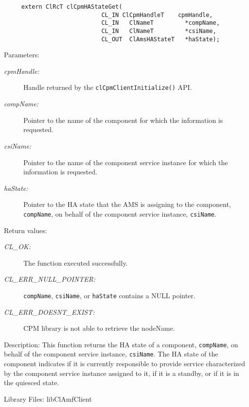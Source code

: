 {\begin{Desc}
\footnotesize\begin{verbatim}     extern ClRcT clCpmHAStateGet(
                  			CL_IN ClCpmHandleT    cpmHandle,
                  			CL_IN   ClNameT         *compName,
                  			CL_IN   ClNameT         *csiName,
                  			CL_OUT  ClAmsHAStateT   *haState);
\end{verbatim}
\normalsize
\end{Desc}
\begin{Desc}
\item[Parameters:]
\begin{description}
\item[{\em cpm\-Handle:}]Handle returned by the {\tt{cl\-Cpm\-Client\-Initialize()}} API. 
\item[{\em comp\-Name:}]Pointer to the name of the component for which the information is requested.
\item[{\em csi\-Name:}]Pointer to the name of the component service instance for which the information is requested.
\item[{\em ha\-State:}]Pointer to the HA state that the AMS is assigning to the component, {\tt{comp\-Name}}, on behalf of the component service instance,
{\tt{csi\-Name}}.
\end{description}
\end{Desc}
\begin{Desc}
\item[Return values:]
\begin{description}
\item[{\em CL\_\-OK:}]The function executed successfully. 
\item[{\em CL\_\-ERR\_\-NULL\_\-POINTER:}]{\tt{compName}}, {\tt{csiName}}, or {\tt{haState}} contains a NULL pointer.
\item[{\em CL\_\-ERR\_\-DOESNT\_\-EXIST:}]CPM library is not able to retrieve the node\-Name.\end{description}
\end{Desc}
\begin{Desc}
\item[Description:]This function returns the HA state of a component, {\tt{comp\-Name}}, on behalf of the component service instance, {\tt{csi\-Name}}. The
HA state of the component indicates if it is currently responsible to provide service characterized by the component service instance assigned to it, if 
it is a standby, or if it is in the quiesced state.
\end{Desc}
\begin{Desc}
\item[Library Files:]lib\-Cl\-Amf\-Client\end{Desc}

}
